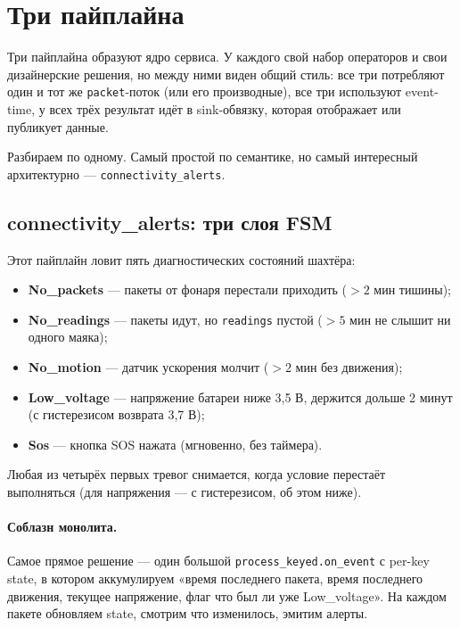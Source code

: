 
\section{Три пайплайна}\label{sec:pipelines}

Три пайплайна образуют ядро сервиса. У каждого свой набор операторов
и свои дизайнерские решения, но между ними виден общий стиль: все
три потребляют один и тот же \texttt{packet}-поток (или его
производные), все три используют event-time, у всех трёх результат
идёт в sink-обвязку, которая отображает или публикует данные.

Разбираем по одному. Самый простой по семантике, но самый
интересный архитектурно --- \texttt{connectivity\_alerts}.

\subsection{connectivity\_alerts: три слоя FSM}\label{ssec:connectivity}

Этот пайплайн ловит пять диагностических состояний шахтёра:

\begin{itemize}
\item \textbf{No\_packets} --- пакеты от фонаря перестали приходить
($> 2$ мин тишины);
\item \textbf{No\_readings} --- пакеты идут, но \texttt{readings}
пустой ($> 5$ мин не слышит ни одного маяка);
\item \textbf{No\_motion} --- датчик ускорения молчит ($> 2$ мин
без движения);
\item \textbf{Low\_voltage} --- напряжение батареи ниже 3{,}5 В,
держится дольше 2 минут (с гистерезисом возврата 3{,}7 В);
\item \textbf{Sos} --- кнопка SOS нажата (мгновенно, без таймера).
\end{itemize}

Любая из четырёх первых тревог снимается, когда условие перестаёт
выполняться (для напряжения --- с гистерезисом, об этом ниже).

\paragraph{Соблазн монолита.} Самое прямое решение --- один большой
\texttt{process\_keyed.on\_event} с per-key state, в котором
аккумулируем «время последнего пакета, время последнего движения,
текущее напряжение, флаг что был ли уже Low\_voltage». На каждом
пакете обновляем state, смотрим что изменилось, эмитим алерты.

